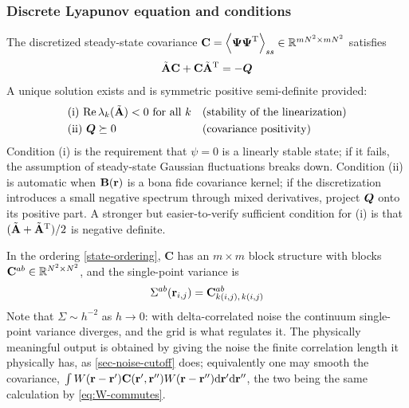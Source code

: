\documentclass[a5paper]{article}
\begin{document}
\subsubsection{Discrete Lyapunov equation and conditions}
\label{sec-lyap-conditions}
The discretized steady-state covariance $\mathbf{C} = \left\langle \boldsymbol\Psi \boldsymbol\Psi^{\mathrm{T}}\right\rangle_{ss}\in\mathbb{R}^{mN^2\times mN^2}$ satisfies
\begin{align}
    \label{lyapunov-discrete}
    \tilde{\mathbf{A}}\mathbf{C} + \mathbf{C}\tilde{\mathbf{A}}^{\mathrm{T}} = -\boldsymbol Q
\end{align}
A unique solution exists and is symmetric positive semi-definite provided:
\begin{align}
    &\text{(i) } \mathrm{Re}\,\lambda_k(\tilde{\mathbf{A}}) < 0 \text{ for all } k
    &&\text{(stability of the linearization)}
    \\
    &\text{(ii) } \boldsymbol Q \succeq 0
    &&\text{(covariance positivity)}
\end{align}
Condition (i) is the requirement that $\psi=0$ is a linearly stable state; if it fails, the assumption of steady-state Gaussian fluctuations breaks down. Condition (ii) is automatic when $\mathbf{B}(\mathbf{r})$ is a bona fide covariance kernel; if the discretization introduces a small negative spectrum through mixed derivatives, project $\boldsymbol Q$ onto its positive part. A stronger but easier-to-verify sufficient condition for (i) is that $(\tilde{\mathbf{A}}+\tilde{\mathbf{A}}^{\mathrm{T}})/2$ is negative definite.

In the ordering \eqref{state-ordering}, $\mathbf{C}$ has an $m\times m$ block structure with blocks $\mathbf{C}^{ab}\in\mathbb{R}^{N^2\times N^2}$, and the single-point variance is
\begin{align}
    \label{variance-extraction}
    \Sigma^{ab}(\mathbf{r}_{i,j}) = \mathbf{C}^{ab}_{k(i,j),\,k(i,j)}
\end{align}
Note that $\Sigma\sim h^{-2}$ as $h\to 0$: with delta-correlated noise the continuum single-point variance diverges, and the grid is what regulates it. The physically meaningful output is obtained by giving the noise the finite correlation length it physically has, as \cref{sec-noise-cutoff} does; equivalently one may smooth the covariance, $\int W(\mathbf{r}-\mathbf{r}')\mathbf{C}(\mathbf{r}',\mathbf{r}'')W(\mathbf{r}-\mathbf{r}'')\mathrm{d}\mathbf{r}'\mathrm{d}\mathbf{r}''$, the two being the same calculation by \eqref{eq:W-commutes}.
\end{document}
